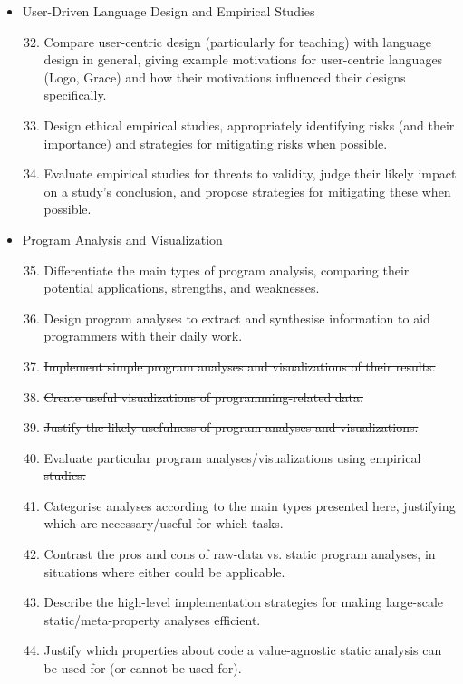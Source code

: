 \documentclass{article}
\begin{document}
\begin{itemize}
    \item User-Driven Language Design and Empirical Studies
    \begin{enumerate}
        \setcounter{enumi}{31}
        \item Compare user-centric design (particularly for teaching) with language design in general, giving example motivations for user-centric languages (Logo, Grace) and how their motivations influenced their designs specifically.
        \item Design ethical empirical studies, appropriately identifying risks (and their importance) and strategies for mitigating risks when possible.
        \item Evaluate empirical studies for threats to validity, judge their likely impact on a study's conclusion, and propose strategies for mitigating these when possible.
    \end{enumerate}
    \item Program Analysis and Visualization
    \begin{enumerate}
        \setcounter{enumi}{34}
        \item Differentiate the main types of program analysis, comparing their potential applications, strengths, and weaknesses.
        \item Design program analyses to extract and synthesise information to aid programmers with their daily work.
        \item \sout{Implement simple program analyses and visualizations of their results.}
        \item \sout{Create useful visualizations of programming-related data.}
        \item \sout{Justify the likely usefulness of program analyses and visualizations.}
        \item \sout{Evaluate particular program analyses/visualizations using empirical studies.}
        \item Categorise analyses according to the main types presented here, justifying which are necessary/useful for which tasks.
        \item Contrast the pros and cons of raw-data vs. static program analyses, in situations where either could be applicable.
        \item Describe the high-level implementation strategies for making large-scale static/meta-property analyses efficient.
        \item Justify which properties about code a value-agnostic static analysis can be used for (or cannot be used for).

\end{enumerate}
\end{itemize}
\end{document}
